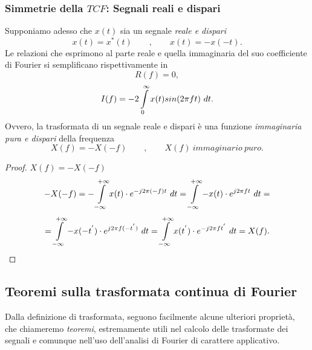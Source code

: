 \documentclass[12pt,oneside,openany]{memoir}
\numberwithin{equation}{subsection}
\newcommand{\dt}{\ dt}
\begin{document}
\subsubsection{Simmetrie della $TCF$: Segnali reali e dispari}
Supponiamo adesso che $x(t)$ sia un segnale \textit{reale e dispari}
\[
	x(t) = x^*(t) \quad\quad , \quad\quad x(t) = -x(-t).
\]
Le relazioni che esprimono al parte reale e quella immaginaria del suo
coefficiente di Fourier si semplificano rispettivamente in
\[
	R(f) = 0,
\]
\[
	I(f) = -2 \int\displaylimits_{0}^{\infty} x(t) sin(2 \pi f t) \dt.
\]
Ovvero, la trasformata di un segnale reale e dispari \`e una funzione
\textit{immaginaria pura e dispari} della frequenza
\[
	X(f) = -X(-f) \quad\quad , \quad\quad X(f) \ immaginario \ puro.
\]
\begin{proof}
$X(f) = -X(-f)$
\[
	-X(-f) = -\int\displaylimits_{-\infty}^{+\infty} x(t) \cdot
	e^{-j 2 \pi (-f) t} \dt = \int\displaylimits_{-\infty}^{+\infty} -x(t)
	\cdot e^{j 2 \pi f t} \dt =
\]
\[
	= \int\displaylimits_{-\infty}^{+\infty} -x(-t^{'}) \cdot
	e^{j 2 \pi f (-t^{'})} \dt = \int\displaylimits_{-\infty}^{+\infty}
	x(t^{'}) \cdot e^{-j 2 \pi f t^{'}} \dt = X(f).
\]
\end{proof}


\newpage
\subsection{Teoremi sulla trasformata continua di Fourier}
Dalla definizione di trasformata, seguono facilmente alcune ulteriori
propriet\`a, che chiameremo \textit{teoremi}, estremamente utili nel calcolo
delle trasformate dei segnali e comunque nell'uso dell'analisi di Fourier di
carattere applicativo.

\end{document}
